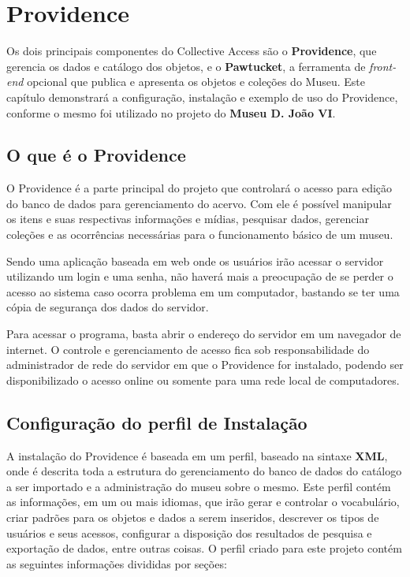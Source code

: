 \documentclass[a4paper,12pt,oneside,onecolumn,final,fleqn]{repUERJ}
\begin{document}
\chapter{Providence}

Os dois principais componentes do Collective Access são o \textbf{Providence}, que gerencia os dados e catálogo dos objetos, e o \textbf{Pawtucket}, a ferramenta de \textit{front-end} opcional que publica e apresenta os objetos e coleções do Museu. Este capítulo demonstrará a configuração, instalação e exemplo de uso do Providence, conforme o mesmo foi utilizado no projeto do \textbf{Museu D. João VI}.

\section{O que é o Providence}

O Providence é a parte principal do projeto que controlará o acesso para edição do banco de dados para gerenciamento do acervo. Com ele é possível manipular os itens e suas respectivas informações e mídias, pesquisar dados, gerenciar coleções e as ocorrências necessárias para o funcionamento básico de um museu.

Sendo uma aplicação baseada em web onde os usuários irão acessar o servidor utilizando um login e uma senha, não haverá mais a preocupação de se perder o acesso ao sistema caso ocorra problema em um computador, bastando se ter uma cópia de segurança dos dados do servidor.

Para acessar o programa, basta abrir o endereço do servidor em um navegador de internet. O controle e gerenciamento de acesso fica sob responsabilidade do administrador de rede do servidor em que o Providence for instalado, podendo ser disponibilizado o acesso online ou somente para uma rede local de computadores.

\section{Configuração do perfil de Instalação}

A instalação do Providence é baseada em um perfil, baseado na sintaxe \textbf{XML}, onde é descrita toda a estrutura do gerenciamento do banco de dados do catálogo a ser importado e a administração do museu sobre o mesmo. Este perfil contém as informações, em um ou mais idiomas, que irão gerar e controlar o vocabulário,  criar padrões para os objetos e dados a serem inseridos, descrever os tipos de usuários e seus acessos, configurar a disposição dos resultados de pesquisa e exportação de dados, entre outras coisas. O perfil criado para este projeto contém as seguintes informações divididas por seções: 
\end{document}
